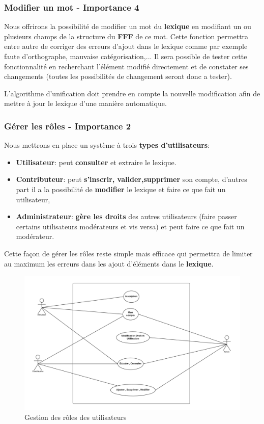 \subsubsection{Modifier un mot - Importance 4}
 
{Nous offrirons la possibilité de modifier un mot du \textbf{lexique} en modifiant un ou plusieurs champs de la structure du \textbf{FFF} de ce mot. Cette fonction permettra entre autre de corriger des erreurs d'ajout dans le lexique comme par exemple faute d'orthographe, mauvaise catégorisation,... Il sera possible de tester cette fonctionnalité en recherchant l'élément modifié directement et de constater ses changements (toutes les possibilités de changement seront donc a tester).\par} L'algorithme d'unification doit prendre en compte la nouvelle modification afin de mettre à jour le lexique d'une manière automatique.
 
\subsubsection{Gérer les rôles - Importance 2}
    
    Nous mettrons en place un système à trois \textbf{types d'utilisateurs}:
    \begin{itemize}
    \item \textbf{Utilisateur}:  peut \textbf{consulter} et extraire le lexique.
    \item \textbf{Contributeur}: peut \textbf{s'inscrir, valider,supprimer} son compte, d'autres part il a la possibilité de \textbf{modifier} le lexique et faire ce que fait un utilisateur,
    \item \textbf{Administrateur}: \textbf{gère les droits} des autres utilisateurs (faire passer certains utilisateurs modérateurs et vis versa) et peut faire ce que fait un modérateur.
    \end{itemize}
    {Cette façon de gérer les rôles reste simple mais efficace qui permettra de limiter au maximum les erreurs dans les ajout d'éléments dans le \textbf{lexique}.\par}
    
    \begin{figure}[ht]
        \centering
        \includegraphics[scale=0.3]{uml.png}
        \caption{Gestion des rôles des utilisateurs }
    \end{figure}
    \newpage
    

